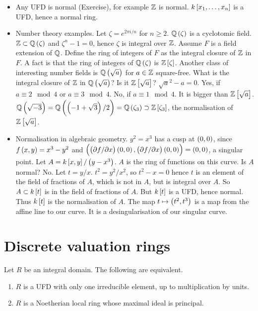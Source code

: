 \begin{example*}
\hfill
\begin{itemize}
\item Any UFD is normal (Exercise), for example $ \mathbb{Z} $ is normal. $ k\sbr{x_1, \dots, x_n} $ is a UFD, hence a normal ring.
\item Number theory examples. Let $ \zeta = e^{2\pi i / n} $ for $ n \ge 2 $. $ \Q\br{\zeta} $ is a cyclotomic field. $ \Z \subset \Q\br{\zeta} $ and $ \zeta^n - 1 = 0 $, hence $ \zeta $ is integral over $ \mathbb{Z} $. Assume $ F $ is a field extension of $ \mathbb{Q} $. Define the ring of integers of $ F $ as the integral closure of $ \mathbb{Z} $ in $ F $. A fact is that the ring of integers of $ \Q\br{\zeta} $ is $ \Z\sbr{\zeta} $. Another class of interesting number fields is $ \Q\br{\sqrt{a}} $ for $ a \in \mathbb{Z} $ square-free. What is the integral closure of $ \mathbb{Z} $ in $ \Q\br{\sqrt{a}} $? Is it $ \Z\sbr{\sqrt{a}} $? $ \sqrt{a}^2 - a = 0 $. Yes, if $ a \equiv 2 \mod 4 $ or $ a \equiv 3 \mod 4 $. No, if $ a \equiv 1 \mod 4 $. It is bigger than $ \Z\sbr{\sqrt{a}} $. $ \Q\br{\sqrt{-3}} = \Q\br{\br{-1 + \sqrt{3}} / 2} = \Q\br{\zeta_3} \supset \Z\sbr{\zeta_3} $, the normalisation of $ \Z\sbr{\sqrt{a}} $.
\item Normalisation in algebraic geometry. $ y^2 = x^3 $ has a cusp at $ \br{0, 0} $, since $ f\br{x, y} = x^3 - y^2 $ and $ \br{\br{\partial f / \partial x}\br{0, 0}, \br{\partial f / \partial x}\br{0, 0}} = \br{0, 0} $, a singular point. Let $ A = k\sbr{x, y} / \br{y - x^3} $. $ A $ is the ring of functions on this curve. Is $ A $ normal? No. Let $ t = y / x $. $ t^2 = y^2 / x^2 $, so $ t^2 - x = 0 $ hence $ t $ is an element of the field of fractions of $ A $, which is not in $ A $, but is integral over $ A $. So $ A \subset k\sbr{t} $ is in the field of fractions of $ A $. But $ k\sbr{t} $ is a UFD, hence normal. Thus $ k\sbr{t} $ is the normalisation of $ A $. The map $ t \mapsto \br{t^2, t^3} $ is a map from the affine line to our curve. It is a desingularisation of our singular curve.
\end{itemize}
\end{example*}

\pagebreak

\section{Discrete valuation rings}


\begin{theorem}
Let $ R $ be an integral domain. The following are equivalent.
\begin{enumerate}
\item $ R $ is a UFD with only one irreducible element, up to multiplication by units.
\item $ R $ is a Noetherian local ring whose maximal ideal is principal.
\end{enumerate}
\end{theorem}

